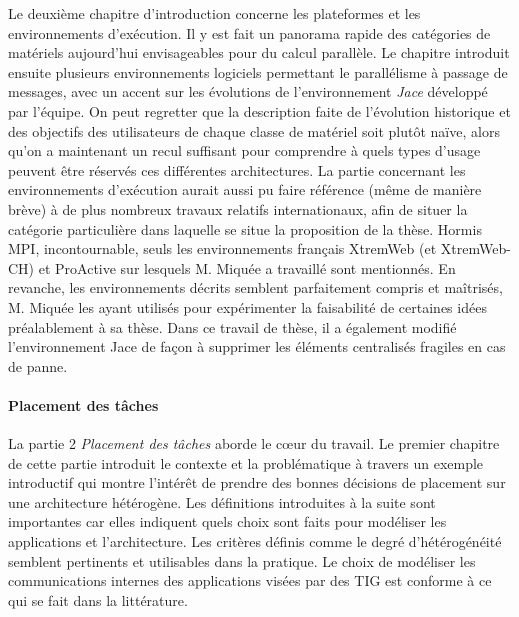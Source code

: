 \documentclass[a4paper,12pt]{article}
\begin{document}
Le deuxième chapitre d'introduction concerne les plateformes et les
environnements d'exécution. Il y est fait un panorama rapide des catégories 
de matériels aujourd'hui envisageables pour du calcul parallèle. Le chapitre 
introduit ensuite plusieurs environnements logiciels permettant le parallélisme 
à passage de messages, avec un accent sur les évolutions de l'environnement 
\textit{Jace} développé par l'équipe. On peut regretter que la description faite 
de l'évolution historique et des objectifs des utilisateurs de chaque classe 
de matériel soit plutôt naïve, alors qu'on a maintenant un recul suffisant pour 
comprendre à quels types d'usage peuvent être réservés ces différentes architectures. 
La partie concernant les environnements d'exécution aurait aussi pu faire référence (même 
de manière brève) à de plus nombreux travaux relatifs internationaux, afin de 
situer la catégorie particulière dans laquelle se situe la proposition de la thèse. 
Hormis MPI, incontournable, seuls les environnements français XtremWeb (et XtremWeb-CH)
et ProActive sur lesquels M. Miquée a travaillé sont mentionnés. En revanche, les 
environnements décrits semblent parfaitement compris et maîtrisés, M. Miquée les 
ayant utilisés pour expérimenter la faisabilité de certaines idées préalablement 
à sa thèse. Dans ce travail de thèse, il a également modifié l'environnement Jace 
de façon à supprimer les éléments centralisés fragiles en cas de panne.


\paragraph*{Placement des tâches}

La partie 2 \textit{Placement des tâches} aborde le c{\oe}ur du travail.
Le premier chapitre de cette partie introduit le contexte et la problématique
à travers un exemple introductif qui montre l'intérêt de prendre des bonnes
décisions de placement sur une architecture hétérogène. Les définitions
introduites à la suite sont importantes car elles indiquent quels choix
sont faits pour modéliser les applications et l'architecture. Les critères
définis comme le degré d'hétérogénéité semblent pertinents et utilisables
dans la pratique. Le choix de modéliser les communications internes des
applications visées par des TIG est conforme à ce qui se fait dans la
littérature.
\end{document}
